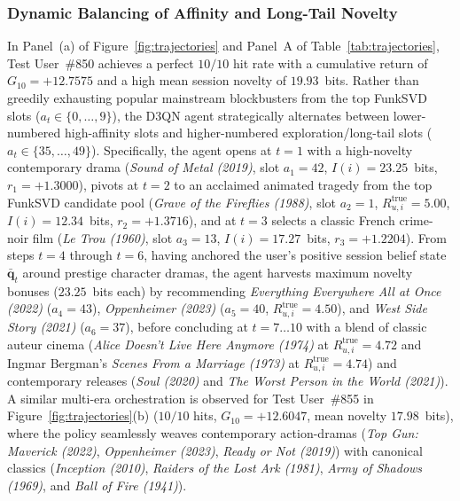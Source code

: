 \subsubsection{Dynamic Balancing of Affinity and Long-Tail Novelty}
In Panel~(a) of Figure~\ref{fig:trajectories} and Panel~A of Table~\ref{tab:trajectories}, Test User~\#850 achieves a perfect $10/10$ hit rate with a cumulative return of $G_{10} = +12.7575$ and a high mean session novelty of $19.93$~bits. Rather than greedily exhausting popular mainstream blockbusters from the top FunkSVD slots ($a_t \in \{0, \dots, 9\}$), the D3QN agent strategically alternates between lower-numbered high-affinity slots and higher-numbered exploration/long-tail slots ($a_t \in \{35, \dots, 49\}$). Specifically, the agent opens at $t=1$ with a high-novelty contemporary drama (\textit{Sound of Metal (2019)}, slot $a_1=42$, $I(i)=23.25$~bits, $r_1 = +1.3000$), pivots at $t=2$ to an acclaimed animated tragedy from the top FunkSVD candidate pool (\textit{Grave of the Fireflies (1988)}, slot $a_2=1$, $R_{u,i}^{\text{true}} = 5.00$, $I(i)=12.34$~bits, $r_2 = +1.3716$), and at $t=3$ selects a classic French crime-noir film (\textit{Le Trou (1960)}, slot $a_3=13$, $I(i)=17.27$~bits, $r_3 = +1.2204$). From steps $t=4$ through $t=6$, having anchored the user's positive session belief state $\bar{\mathbf{q}}_t$ around prestige character dramas, the agent harvests maximum novelty bonuses ($23.25$~bits each) by recommending \textit{Everything Everywhere All at Once (2022)} ($a_4=43$), \textit{Oppenheimer (2023)} ($a_5=40$, $R_{u,i}^{\text{true}}=4.50$), and \textit{West Side Story (2021)} ($a_6=37$), before concluding at $t=7 \dots 10$ with a blend of classic auteur cinema (\textit{Alice Doesn't Live Here Anymore (1974)} at $R_{u,i}^{\text{true}}=4.72$ and Ingmar Bergman's \textit{Scenes From a Marriage (1973)} at $R_{u,i}^{\text{true}}=4.74$) and contemporary releases (\textit{Soul (2020)} and \textit{The Worst Person in the World (2021)}). A similar multi-era orchestration is observed for Test User~\#855 in Figure~\ref{fig:trajectories}(b) ($10/10$ hits, $G_{10} = +12.6047$, mean novelty $17.98$~bits), where the policy seamlessly weaves contemporary action-dramas (\textit{Top Gun: Maverick (2022)}, \textit{Oppenheimer (2023)}, \textit{Ready or Not (2019)}) with canonical classics (\textit{Inception (2010)}, \textit{Raiders of the Lost Ark (1981)}, \textit{Army of Shadows (1969)}, and \textit{Ball of Fire (1941)}).

